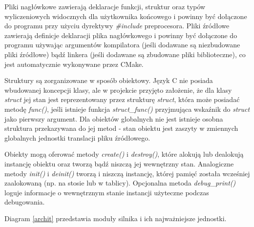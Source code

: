 Pliki nagłówkowe zawierają deklaracje funkcji, struktur oraz typów wyliczeniowych widocznych dla użytkownika końcowego i powinny być dołączone do programu przy użyciu dyrektywy \textit{\#include} preprocesora.
Pliki źródłowe zawierają definicje deklaracji plika nagłówkowego i powinny być dołączone do programu używając argumentów kompilatora (jeśli dodawane są niezbudowane pliki źródłowe) bądź linkera (jeśli dodawane są zbudowane pliki biblioteczne), co jest automatycznie wykonywane przez CMake.

Struktury są zorganizowane w sposób obiektowy.
Język C nie posiada wbudowanej koncepcji klasy, ale w projekcie przyjęto założenie, że dla klasy \textit{struct} jej stan jest reprezentowany przez strukturę \textit{struct}, która może posiadać metodę \textit{func()}, jeśli istnieje funkcja \textit{struct\_func()} przyjmująca wskaźnik do \textit{struct} jako pierwszy argument.
Dla obiektów globalnych nie jest istnieje osobna struktura przekazywana do jej metod - stan obiektu jest zaszyty w zmiennych globalnych jednostki translacji pliku źródłowego.

Obiekty mogą oferować metody \textit{create()} i \textit{destroy()}, które alokują lub dealokują instancję obiektu oraz tworzą bądź niszczą jej wewnętrzny stan.
Analogiczne metody \textit{init()} i \textit{deinit()} tworzą i niszczą instancję, której pamięć została wcześniej zaalokowaną (np. na stosie lub w tablicy).
Opcjonalna metoda \textit{debug\_print()} loguje informacje o wewnętrznym stanie instancji użyteczne podczas debugowania.

Diagram \ref{archit} przedstawia moduły silnika i ich najważniejsze jednostki.


